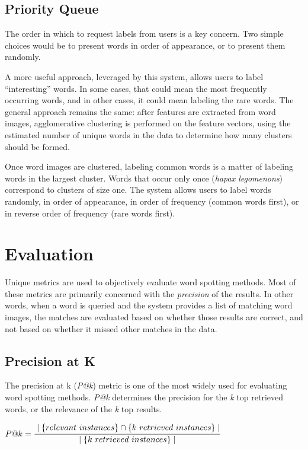 \documentclass[final]{ukthesis}
\begin{document}
\subsection{Priority Queue}
The order in which to request labels from users is a key concern. Two simple choices would be to present words in order of appearance, or to present them randomly.

A more useful approach, leveraged by this system, allows users to label ``interesting'' words. In some cases, that could mean the most frequently occurring words, and in other cases, it could mean labeling the rare words. The general approach remains the same: after features are extracted from word images, agglomerative clustering is performed on the feature vectors, using the estimated number of unique words in the data to determine how many clusters should be formed.

Once word images are clustered, labeling common words is a matter of labeling words in the largest cluster. Words that occur only once ({\em hapax legomenons}) correspond to clusters of size one. The system allows users to label words randomly, in order of appearance, in order of frequency (common words first), or in reverse order of frequency (rare words first).


%
%
\section{Evaluation}
\label{sec:evaluation}
Unique metrics are used to objectively evaluate word spotting methods. Most of these metrics are primarily concerned with the {\em precision} of the results. In other words, when a word is queried and the system provides a list of matching word images, the matches are evaluated based on whether those results are correct, and not based on whether it missed other matches in the data.

\subsection{Precision at K}
The precision at k ({\em P@k}) metric is one of the most widely used for evaluating word spotting methods. {\em P@k} determines the precision for the {\em k} top retrieved words, or the relevance of the {\em k} top results.
\begin{center}
\begin{math}
{P@k}=\cfrac{\mid\{relevant\ instances\}\cap\{k\ retrieved\ instances\}\mid} {\mid \{k\ retrieved\ instances\}\mid}
\end{math}
\end{center}
\end{document}
